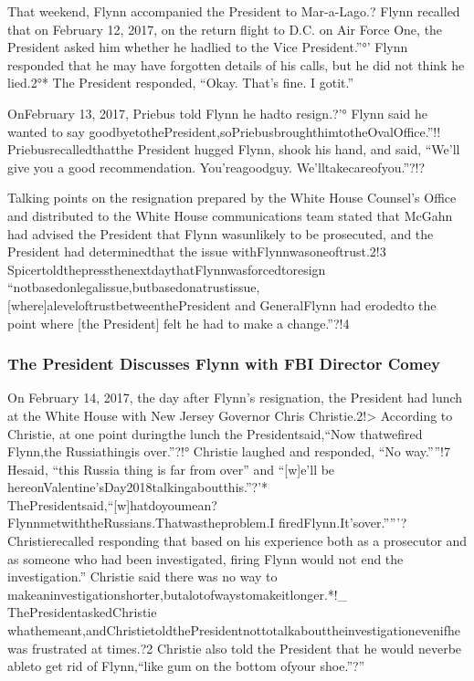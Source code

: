 That weekend, Flynn accompanied the President to Mar-a-Lago.?
Flynn recalled that on February 12, 2017, on the return flight to D.C. on Air Force One, the President asked him whether he hadlied to the Vice President.”°’
Flynn responded that he may have forgotten details of his calls, but he did not think he lied.2°*
The President responded, “Okay.
That’s fine.
I gotit.”

OnFebruary 13, 2017, Priebus told Flynn he hadto resign.?'°
Flynn said he wanted to say goodbyetothePresident,soPriebusbroughthimtotheOvalOffice.”!!
Priebusrecalledthatthe President hugged Flynn, shook his hand, and said, “We'll give you a good recommendation.
You'reagoodguy.
We’lltakecareofyou.”?!?

Talking points on the resignation prepared by the White House Counsel’s Office and distributed to the White House communications team stated that McGahn had advised the President that Flynn wasunlikely to be prosecuted, and the President had determinedthat the issue withFlynnwasoneoftrust.2!3
SpicertoldthepressthenextdaythatFlynnwasforcedtoresign “notbasedonlegalissue,butbasedonatrustissue,[where]aleveloftrustbetweenthePresident and GeneralFlynn had erodedto the point where [the President] felt he had to make a change.”?!4

\subsubsection{The President Discusses Flynn with FBI Director Comey}

On February 14, 2017, the day after Flynn’s resignation, the President had lunch at the White House with New Jersey Governor Chris Christie.2!>
According to Christie, at one point duringthe lunch the Presidentsaid,“Now thatwefired Flynn,the Russiathingis over.”?!°
Christie laughed and responded, “No way.””!7
Hesaid, “this Russia thing is far from over” and “[w]e’ll be hereonValentine’sDay2018talkingaboutthis.”?'*
ThePresidentsaid,“[w]hatdoyoumean? FlynnmetwiththeRussians.Thatwastheproblem.I firedFlynn.It’sover.””'?
Christierecalled responding that based on his experience both as a prosecutor and as someone who had been investigated, firing Flynn would not end the investigation.”
Christie said there was no way to makeaninvestigationshorter,butalotofwaystomakeitlonger.*!_
ThePresidentaskedChristie whathemeant,andChristietoldthePresidentnottotalkabouttheinvestigationevenifhewas frustrated at times.?2
Christie also told the President that he would neverbe ableto get rid of Flynn,“like gum on the bottom ofyour shoe.”?”

